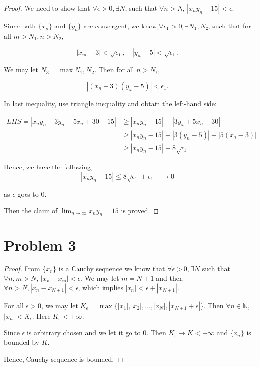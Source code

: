 \documentclass[12pt]{article}
\begin{document}
\begin{proof}
We need to show that $\forall \epsilon > 0, \exists N$, such that $\forall n > N$, $|x_ny_n - 15| <  \epsilon$.

Since both $\{x_n\}$ and $\{y_n\}$ are convergent, we know,$\forall \epsilon_1 > 0, \exists N_1, N_2$, such that for all $m > N_1, n > N_2$, 
 
$$
|x_m - 3| < \sqrt{\epsilon_1}, \quad |y_n - 5| < \sqrt{\epsilon_1}.
$$

We may let $N_3 = \max{N_1, N_2}$. Then for all $n > N_3$, 

$$
|(x_n - 3)(y_n - 5)| < \epsilon_1.
$$

In last inequality, use triangle inequality and obtain the left-hand side: 

$$
\begin{aligned}
LHS = |x_ny_n - 3y_n - 5x_n + 30 -15| & \geqslant |x_ny_n - 15| - |3y_n + 5x_n - 30| \\
& \geqslant |x_ny_n - 15| - |3(y_n - 5)| - |5(x_n - 3)| \\
& \geqslant |x_ny_n - 15| - 8\sqrt{\epsilon_1}
\end{aligned}
$$

Hence, we have the following,
$$
|x_ny_n - 15| \leqslant 8\sqrt{\epsilon_1} + \epsilon_1 \quad \rightarrow 0 
$$

as $\epsilon$ goes to 0.

Then the claim of $\lim_{n \rightarrow \infty} x_ny_n = 15$ is proved.



\end{proof}

\section*{Problem 3}

\begin{proof}

From $\{x_n\}$ is a Cauchy sequence we know that $\forall \epsilon > 0, \exists N$ such that $\forall n, m > N$, $|x_n - x_m| < \epsilon$. We may let $m = N + 1$ and then $\forall n > N, |x_n - x_{N+1}| < \epsilon$, which implies $|x_n| < \epsilon + |x_{N+1}|$.

For all $\epsilon > 0$, we may let $K_\epsilon = \max\{|x_1|, |x_2|, \dots, |x_N|, |x_{N+1} + \epsilon|\} $. Then $\forall n \in \mathbb{N}$, $|x_n| < K_\epsilon $. Here $K_\epsilon < +\infty$.

Since $\epsilon$ is arbitrary chosen and we let it go to 0. Then $K_\epsilon \rightarrow K < +\infty$ and $\{x_n\}$ is bounded by $K$.

Hence, Cauchy sequence is bounded.


\end{proof}
\end{document}
